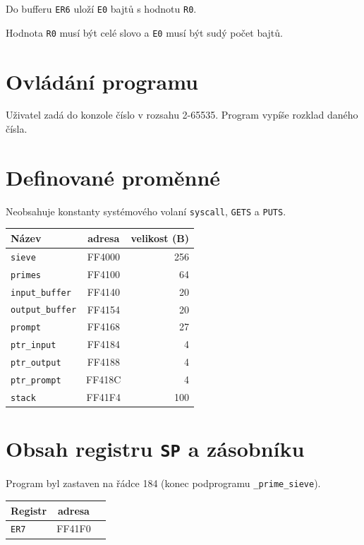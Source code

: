 \documentclass[12pt]{article}
\newcommand{\code}[1]{\mbox{\texttt{#1}}}
\begin{document}
Do bufferu \code{ER6} uloží \code{E0} bajtů s hodnotu \code{R0}.

Hodnota \code{R0} musí být celé slovo a \code{E0} musí být sudý počet bajtů.

\section{Ovládání programu}

Uživatel zadá do konzole číslo v rozsahu 2-65535. Program vypíše rozklad daného
čísla.

\section{Definované proměnné}

Neobsahuje konstanty systémového volaní \code{syscall}, \code{GETS} a
\code{PUTS}.

\begin{table}[H]
	\centering
	\begin{tabular}{|l|c|r|}
		\hline
		Název                 & adresa & velikost (B) \\ \hline
		\code{sieve}          & FF4000 & 256          \\ \hline
		\code{primes}         & FF4100 & 64           \\ \hline
		\code{input\_buffer}  & FF4140 & 20           \\ \hline
		\code{output\_buffer} & FF4154 & 20           \\ \hline
		\code{prompt}         & FF4168 & 27           \\ \hline
		\code{ptr\_input}     & FF4184 & 4            \\ \hline
		\code{ptr\_output}    & FF4188 & 4            \\ \hline
		\code{ptr\_prompt}    & FF418C & 4            \\ \hline
		\code{stack}          & FF41F4 & 100          \\ \hline
	\end{tabular}
\end{table}

\section{Obsah registru \code{SP} a zásobníku}

Program byl zastaven na řádce 184 (konec podprogramu \code{\_prime\_sieve}).


\begin{table}[H]
	\centering
	\begin{tabular}{|l|c|r|}
		\hline
		Registr    & adresa \\ \hline
		\code{ER7} & FF41F0 \\ \hline
	\end{tabular}
\end{table}
\end{document}
